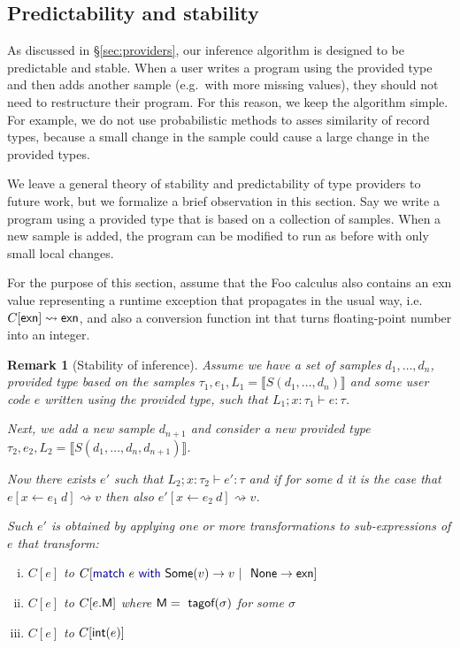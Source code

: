 \documentclass[10pt]{sigplanconf}
\newcommand{\kvd}[1]{\textnormal{\textcolor{kvdclr}{\sffamily #1}}}
\newcommand{\ident}[1]{\textnormal{\sffamily #1}}
\newcommand{\tytagof}{\ident{tagof}}
\newcommand{\reduce}{\rightsquigarrow}
\newcommand{\sem}[1]{\llbracket #1 \rrbracket}
\newcommand{\semalt}[1]{S(#1)}
\newtheorem{remark}{Remark}
\begin{document}

\subsection{Predictability and stability} 
\label{sec:impl-stable}

As discussed in \S\ref{sec:providers}, our inference algorithm is designed to be predictable
and stable. When a user writes a program using the provided type and then adds another sample 
(e.g.~with more missing values), they should not need to restructure their program. 
For this reason, we keep the algorithm simple. For example, we do not use probabilistic methods to 
asses similarity of record types, because a small change in the sample could cause a large change 
in the provided types.

We leave a general theory of stability and predictability of type providers to future work, but
we formalize a brief observation in this section. Say we write a program using a provided type
that is based on a collection of samples. When a new sample is added, the program can be modified
to run as before with only small local changes. 

For the purpose of this section, assume that the Foo calculus also contains an \ident{exn} 
value representing a runtime exception that propagates in the usual way, 
i.e.~$C[\ident{exn}]\reduce\ident{exn}$, and also a conversion function \ident{int} that
turns floating-point number into an integer.

\begin{remark}[Stability of inference]
Assume we have a set of samples $d_1, \ldots, d_n$, provided type based on the samples
$\tau_1, e_1, L_1 = \sem{\semalt{d_1, \ldots, d_n}}$ and some user code $e$ written using
the provided type, such that $L_1; x:\tau_1\vdash e : \tau$. 

Next, we add a new sample $d_{n+1}$ and consider a new provided type 
$\tau_2, e_2, L_2 = \sem{\semalt{d_1, \ldots, d_n, d_{n+1}}}$.

Now there exists $e'$ such that $L_2; x:\tau_2\vdash e' : \tau$ and if
for some $d$ it is the case that $e[x\leftarrow e_1~d] \reduce v$ then
also $e'[x\leftarrow e_2~d] \reduce v$.

Such $e'$ is obtained by applying one or more transformations to sub-expressions of $e$
that transform:
%
\begin{enumerate}[(i)]
\item
$C[e]$ to $C[\kvd{match}~e~\kvd{with}~\ident{Some}(v) \rightarrow v~|~\ident{None} \rightarrow \ident{exn}]$
\item
$C[e]$ to $C[e.\ident{M}]$ where $\ident{M} = \tytagof(\sigma)$ for some $\sigma$
\item
$C[e]$ to $C[\ident{int}(e)]$
\end{enumerate}
\end{remark}
\end{document}
